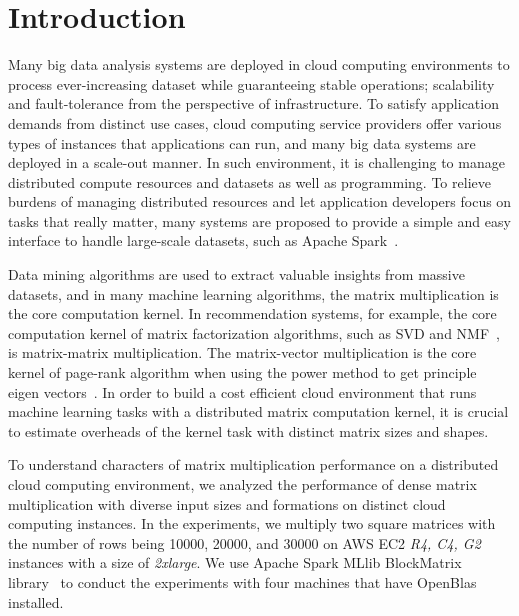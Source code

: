 \documentclass[10pt, conference, compsocconf]{IEEEtran}
\begin{document}
\IEEEpeerreviewmaketitle

\section{Introduction}\label{sec:intro}
Many big data analysis systems are deployed in cloud computing environments to process ever-increasing dataset while guaranteeing stable operations; scalability and fault-tolerance from the perspective of infrastructure. To satisfy application demands from distinct use cases, cloud computing service providers offer various types of instances that applications can run, and many big data systems are deployed in a scale-out manner. In such environment, it is challenging to manage distributed compute resources and datasets as well as programming. To relieve burdens of managing distributed resources and let application developers focus on tasks that really matter, many systems are proposed to provide a simple and easy interface to handle large-scale datasets, such as Apache Spark~\cite{spark}.

Data mining algorithms are used to extract valuable insights from massive datasets, and in many machine learning algorithms, the matrix multiplication is the core computation kernel. In recommendation systems, for example, the core computation kernel of matrix factorization algorithms, such as SVD and NMF~\cite{nmf}, is matrix-matrix multiplication. The matrix-vector multiplication is the core kernel of page-rank algorithm when using the power method to get principle eigen vectors~\cite{pagerank}. In order to build a cost efficient cloud environment that runs machine learning tasks with a distributed matrix computation kernel, it is crucial to estimate overheads of the kernel task with distinct matrix sizes and shapes.

To understand characters of matrix multiplication performance on a distributed cloud computing environment, we analyzed the performance of dense matrix multiplication with diverse input sizes and formations on distinct cloud computing instances. In the experiments, we multiply two square matrices with the number of rows being 10000, 20000, and 30000 on AWS EC2 \textit{R4, C4, G2} instances with a size of \textit{2xlarge}. We use Apache Spark MLlib BlockMatrix library~\cite{spark-mm} to conduct the experiments with four machines that have OpenBlas installed.
\end{document}
